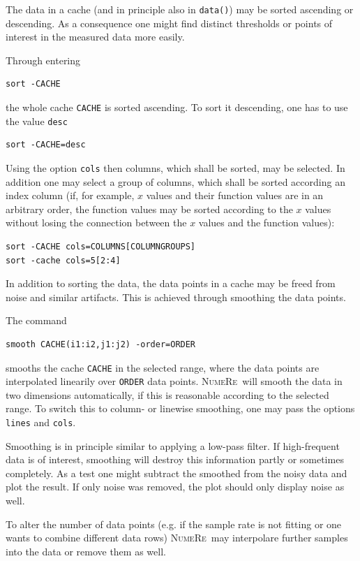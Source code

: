 \documentclass[DIV=14,headsepline,footsepline]{scrbook}
\newcommand{\NR}{\textsc{Nu\-me\-Re}}
\begin{document}
				The data in a cache (and in principle also in \lstinline+data()+) may be sorted ascending or descending. As a consequence one might find distinct thresholds or points of interest in the measured data more easily.
				
				Through entering
				\begin{lstlisting}
sort -CACHE
				\end{lstlisting}
				the whole cache \lstinline+CACHE+ is sorted ascending. To sort it descending, one has to use the value \lstinline+desc+
				\begin{lstlisting}
sort -CACHE=desc
				\end{lstlisting}
				Using the option \lstinline+cols+ then columns, which shall be sorted, may be selected. In addition one may select a group of columns, which shall be sorted according an index column (if, for example, $x$ values and their function values are in an arbitrary order, the function values may be sorted according to the $x$ values without losing the connection between the  $x$ values and the function values):
				\begin{lstlisting}
sort -CACHE cols=COLUMNS[COLUMNGROUPS]
sort -cache cols=5[2:4]
				\end{lstlisting}
				
				In addition to sorting the data, the data points in a cache may be freed from noise and similar artifacts. This is achieved through smoothing the data points.
				
				The command
				\begin{lstlisting}
smooth CACHE(i1:i2,j1:j2) -order=ORDER
				\end{lstlisting}
				smooths the cache \lstinline+CACHE+ in the selected range, where the data points are interpolated linearily over \lstinline+ORDER+ data points. \NR\ will smooth the data in two dimensions automatically, if this is reasonable according to the selected range. To switch this to column- or linewise smoothing, one may pass the options \lstinline+lines+ and \lstinline+cols+.
				
				Smoothing is in principle similar to applying a low-pass filter. If high-frequent data is of interest, smoothing will destroy this information partly or sometimes completely. As a test one might subtract the smoothed from the noisy data and plot the result. If only noise was removed, the plot should only display noise as well.
				
				To alter the number of data points (e.g. if the sample rate is not fitting or one wants to combine different data rows) \NR\ may interpolare further samples into the data or remove them as well.
				
\end{document}
